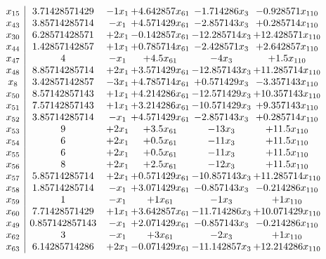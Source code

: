 \documentclass[11pt]{article}
\begin{document}
\[\begin{array}{c| c c@{\hskip 2pt} c@{\hskip 2pt} c@{\hskip 2pt} c@{\hskip 2pt} }
 x_{15}   &  3.71428571429 & -1 x_{1} & + 4.642857 x_{61} & -1.714286 x_{3} & -0.928571 x_{110}\\
 x_{43}   &  3.85714285714 & - x_{1} & + 4.571429 x_{61} & -2.857143 x_{3} & + 0.285714 x_{110}\\
 x_{30}   &  6.28571428571 & + 2 x_{1} & -0.142857 x_{61} & -12.285714 x_{3} & + 12.428571 x_{110}\\
 x_{44}   &  1.42857142857 & + 1 x_{1} & + 0.785714 x_{61} & -2.428571 x_{3} & + 2.642857 x_{110}\\
 x_{47}   &  4 & - x_{1} & + 4.5 x_{61} & -4 x_{3} & + 1.5 x_{110}\\
 x_{48}   &  8.85714285714 & + 2 x_{1} & + 3.571429 x_{61} & -12.857143 x_{3} & + 11.285714 x_{110}\\
 x_{8}   &  3.42857142857 & -3 x_{1} & + 4.785714 x_{61} & + 0.571429 x_{3} & -3.357143 x_{110}\\
 x_{50}   &  8.57142857143 & + 1 x_{1} & + 4.214286 x_{61} & -12.571429 x_{3} & + 10.357143 x_{110}\\
 x_{51}   &  7.57142857143 & + 1 x_{1} & + 3.214286 x_{61} & -10.571429 x_{3} & + 9.357143 x_{110}\\
 x_{52}   &  3.85714285714 & - x_{1} & + 4.571429 x_{61} & -2.857143 x_{3} & + 0.285714 x_{110}\\
 x_{53}   &  9 & + 2 x_{1} & + 3.5 x_{61} & -13 x_{3} & + 11.5 x_{110}\\
 x_{54}   &  6 & + 2 x_{1} & + 0.5 x_{61} & -11 x_{3} & + 11.5 x_{110}\\
 x_{55}   &  6 & + 2 x_{1} & + 0.5 x_{61} & -11 x_{3} & + 11.5 x_{110}\\
 x_{56}   &  8 & + 2 x_{1} & + 2.5 x_{61} & -12 x_{3} & + 11.5 x_{110}\\
 x_{57}   &  5.85714285714 & + 2 x_{1} & + 0.571429 x_{61} & -10.857143 x_{3} & + 11.285714 x_{110}\\
 x_{58}   &  1.85714285714 & - x_{1} & + 3.071429 x_{61} & -0.857143 x_{3} & -0.214286 x_{110}\\
 x_{59}   &  1 & - x_{1} & + 1 x_{61} & -1 x_{3} & + 1 x_{110}\\
 x_{60}   &  7.71428571429 & + 1 x_{1} & + 3.642857 x_{61} & -11.714286 x_{3} & + 10.071429 x_{110}\\
 x_{49}   &  0.857142857143 & - x_{1} & + 2.071429 x_{61} & -0.857143 x_{3} & -0.214286 x_{110}\\
 x_{62}   &  3 & - x_{1} & + 3 x_{61} & -2 x_{3} & + 1 x_{110}\\
 x_{63}   &  6.14285714286 & + 2 x_{1} & -0.071429 x_{61} & -11.142857 x_{3} & + 12.214286 x_{110}\\

\end{array}\]
\end{document}
